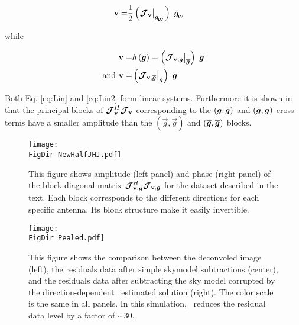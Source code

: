 \begin{alignat}{2}
\label{eq:Lin}
\textbf{v}=&\frac{1}{2}\left(\bm{\mathcal{J}}_{\textbf{v}}\big|_{\bm{g_{\!_{W}}}}\right)\ \bm{g_{\!_{W}}}
\end{alignat}

\noindent while

\begin{alignat}{2}
\label{eq:Lin2}
\vis=&h\left(\vec{g}\right)=\left(\JVg\big|_{\conj{\g}}\right)\ \g\\
\text{and }\vis=&\left(\JVCg\big|_{\g}\right)\ \conj{\g}
\end{alignat}



Both Eq. \ref{eq:Lin} and \ref{eq:Lin2} form linear
systems. Furthermore it is shown in \citet[][]{SmirnovTasse14}
that the principal blocks of $\bm{\mathcal{J}}_{\textbf{v}}^H\bm{\mathcal{J}}_{\textbf{v}}$ corresponding to the
$(\vec{g},\conj{\vec{g}})$ and $(\conj{\vec{g}},\vec{g})$ cross
terms have a smaller amplitude than the $(\vec{g},\vec{g})$ and
$(\conj{\vec{g}},\conj{\vec{g}})$ blocks.


\begin{figure}[h!]
\begin{center}
\texttt{[image: \\FigDir NewHalfJHJ.pdf]}
\caption{\label{fig:HalfJHJ} This figure shows amplitude (left panel)
  and phase (right panel) of the block-diagonal matrix $\bm{\mathcal{J}}_{\textbf{v},\bm{g}}^H\bm{\mathcal{J}}_{\textbf{v},\bm{g}}$
  for the dataset described in the text. Each block corresponds to the
different directions for each specific antenna. Its block structure
make it easily invertible.}
\end{center}
\end{figure}

\begin{figure*}[t!]
\begin{center}
\texttt{[image: \\FigDir Pealed.pdf]}
\caption{\label{fig:resid} This figure shows the comparison between
  the deconvoled image
  (left), the residuals data after simple skymodel subtractions
  (center), and the residuals data after subtracting the
  sky model corrupted by the direction-dependent \COH~estimated solution
  (right). The color scale is the same in all panels. In this
  simulation, \COH~reduces the
residual data level by a factor of $\sim30$.}
\end{center}
\end{figure*}


